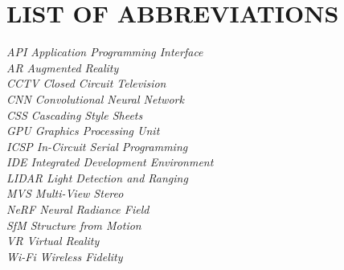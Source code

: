 \chapter*{LIST OF ABBREVIATIONS}
\textit{API    \tabto{6em} Application Programming Interface \\}
\textit{AR   \tabto{6em} Augmented Reality \\}
\textit{CCTV   \tabto{6em} Closed Circuit Television \\}
\textit{CNN    \tabto{6em} Convolutional Neural Network \\}
\textit{CSS   \tabto{6em} Cascading Style Sheets \\}
\textit{GPU    \tabto{6em} Graphics Processing Unit \\}
\textit{ICSP    \tabto{6em} In-Circuit Serial Programming \\}
\textit{IDE    \tabto{6em} Integrated Development Environment \\}
\textit{LIDAR    \tabto{6em} Light Detection and Ranging \\}
\textit{MVS    \tabto{6em} Multi-View Stereo \\}
\textit{NeRF    \tabto{6em} Neural Radiance Field \\}
\textit{SfM     \tabto{6em} Structure from Motion \\}
\textit{VR   \tabto{6em} Virtual Reality \\}
\textit{Wi-Fi  \tabto{6em} Wireless Fidelity \\}